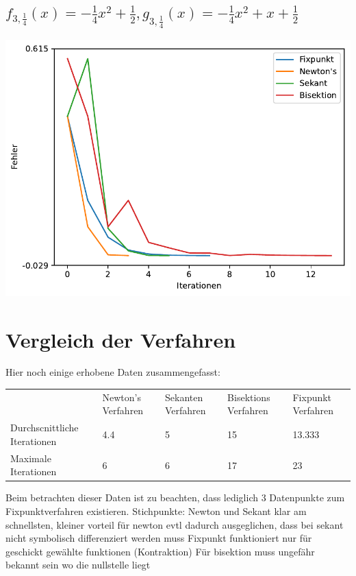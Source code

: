 \documentclass[10pt]{scrartcl}
\newcommand{\1}{1\hspace{-0,9ex}1}
\begin{document}
	\subsection*{$f_{3,\frac{1}{4}}(x) = -\frac{1}{4}x^2 +\frac{1}{2},  g_{3,\frac{1}{4}}(x)=-\frac{1}{4}x^2 + x + \frac{1}{2}$}
	\includegraphics[width=\textwidth]{plots/plot4.pdf}
	\section*{Vergleich der Verfahren}
	Hier noch einige erhobene Daten zusammengefasst:
	\begin{table}[]
		\begin{tabular}{lllll}
									  & Newton's Verfahren & Sekanten Verfahren & Bisektions Verfahren & Fixpunkt Verfahren \\
		Durchscnittliche Iterationen & 4.4                & 5                  & 15                   & 13.333             \\
		Maximale Iterationen          & 6                  & 6                  & 17                   & 23                 \\
		\end{tabular}
	\end{table}
	Beim betrachten dieser Daten ist zu beachten, dass lediglich 3 Datenpunkte zum Fixpunktverfahren existieren.
	Stichpunkte:
	Newton und Sekant klar am schnellsten, kleiner vorteil für newton evtl dadurch ausgeglichen, dass bei sekant nicht symbolisch differenziert werden muss
	Fixpunkt funktioniert nur für geschickt gewählte funktionen (Kontraktion)
	Für bisektion muss ungefähr bekannt sein wo die nullstelle liegt
\end{document}
